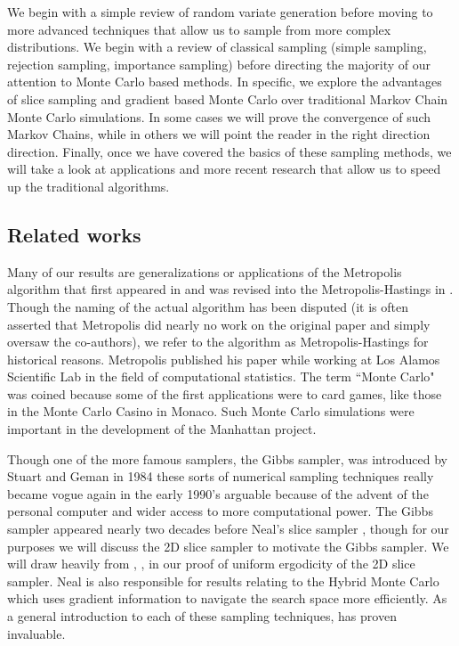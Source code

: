 \documentclass[11pt, a4paper]{article}
\theoremstyle{plain}
\theoremstyle{definition}
\begin{document}
We begin with a simple review of random variate generation before moving to more advanced techniques that allow us to sample from more complex distributions. We begin with a
review of classical sampling (simple sampling, rejection sampling, importance sampling) before directing the majority of our attention to Monte Carlo based methods. In specific, we explore the advantages of slice sampling and gradient based Monte Carlo over traditional Markov Chain Monte Carlo simulations. In some cases we will
prove the convergence  of such Markov Chains, while in others we will point the reader in the right direction
direction. Finally, once we have covered the basics of these sampling methods, we will take a look at applications
and more recent research that allow us to speed up the traditional algorithms.
\subsection{Related works}

Many of our results are generalizations or applications of the Metropolis algorithm that first appeared in \cite{metropolis1953equation} and
was revised into the Metropolis-Hastings in \cite{hastings1970monte}. Though the naming of the actual algorithm
has been disputed (it is often asserted that Metropolis did nearly no work on the original paper and simply oversaw the co-authors), we refer to the algorithm as Metropolis-Hastings for historical reasons.  Metropolis published
his paper while working at Los Alamos Scientific Lab in the field of computational statistics. The term ``Monte Carlo"
was coined because some of the first applications were to card games, like those in the Monte Carlo Casino in Monaco. Such Monte Carlo simulations were important in the development of the Manhattan project.

Though one of the more famous samplers, the Gibbs sampler, was introduced by Stuart and Geman in 1984 \cite{geman1984stochastic} these sorts of numerical sampling techniques really became vogue again in the early 1990's arguable because of the
advent of the personal computer and wider access to more computational power. The Gibbs sampler appeared nearly two decades before Neal's slice sampler \cite{neal2003slice}, though for our purposes we will
discuss the 2D slice sampler to motivate the Gibbs sampler. We will draw heavily from \cite{mira2002efficiency}, \cite{roberts1998}, \cite{robert2004monte} in our proof of uniform ergodicity of the 2D slice sampler. Neal is also responsible for results relating to the Hybrid Monte Carlo \cite{brooks2011handbook} which uses gradient information to navigate the search space more efficiently. As a general introduction to each of these sampling
techniques, \cite{bishop2006pattern} has proven invaluable.
\end{document}
